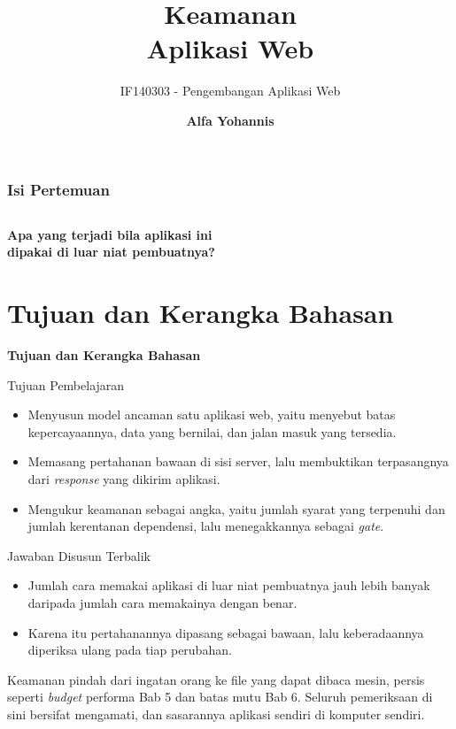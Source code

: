 \documentclass[aspectratio=169, table, 12pt]{beamer}
\title{\Huge Keamanan\\ \vspace{10pt} Aplikasi Web}
\subtitle{IF140303 - Pengembangan Aplikasi Web}
\author{\textbf{Alfa Yohannis}}
\begin{document}
\frame{\titlepage}

\begin{frame}[fragile]
  \frametitle{Isi Pertemuan}
  \vspace{14pt}
  \begin{columns}[t]
    {\small\tableofcontents[sections={1-7}]}

    {\small\tableofcontents[sections={8-14}]}
  \end{columns}
\end{frame}

\begin{frame}{\hfill}
  \centering
  \Huge{\textbf{Apa yang terjadi bila aplikasi ini\\dipakai di luar niat pembuatnya?}}
\end{frame}

\section{Tujuan dan Kerangka Bahasan}

\begin{frame}{\hfill}
  \centering
  \Huge{\textbf{Tujuan dan Kerangka Bahasan}}
\end{frame}

\begin{frame}{{\Large Tujuan Pembelajaran}}
  \vspace{10pt}
  \begin{itemize}
    \item Menyusun model ancaman satu aplikasi web, yaitu menyebut batas
          kepercayaannya, data yang bernilai, dan jalan masuk yang tersedia.
    \item Memasang pertahanan bawaan di sisi server, lalu membuktikan
          terpasangnya dari \textit{response} yang dikirim aplikasi.
    \item Mengukur keamanan sebagai angka, yaitu jumlah syarat yang terpenuhi
          dan jumlah kerentanan dependensi, lalu menegakkannya sebagai
          \textit{gate}.
  \end{itemize}
\end{frame}

\begin{frame}{{\Large Jawaban Disusun Terbalik}}
  \vspace{12pt}
  \begin{itemize}
    \item Jumlah cara memakai aplikasi di luar niat pembuatnya jauh lebih
          banyak daripada jumlah cara memakainya dengan benar.
    \item Karena itu pertahanannya dipasang sebagai bawaan, lalu
          keberadaannya diperiksa ulang pada tiap perubahan.
  \end{itemize}
  \vspace{10pt}
  {\small Keamanan pindah dari ingatan orang ke file yang dapat dibaca mesin,
  persis seperti \textit{budget} performa Bab 5 dan batas mutu Bab 6. Seluruh
  pemeriksaan di sini bersifat mengamati, dan sasarannya aplikasi sendiri di
  komputer sendiri.}
\end{frame}
\end{document}
